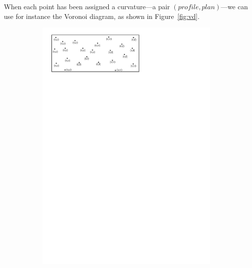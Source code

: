 When each point has been assigned a curvature---a pair $(profile,plan)$---we can use for instance the Voronoi diagram, as shown in Figure~\ref{fig:vd}.
\begin{figure}
  \centering
  \begin{subfigure}[b]{0.45\linewidth}
    \centering
    \includegraphics[page=1,width=\textwidth]{figs/vd}
    \caption{}
  \end{subfigure}%
  \qquad
  \begin{subfigure}[b]{0.45\linewidth}
    \centering

\end{subfigure}
\end{figure}
